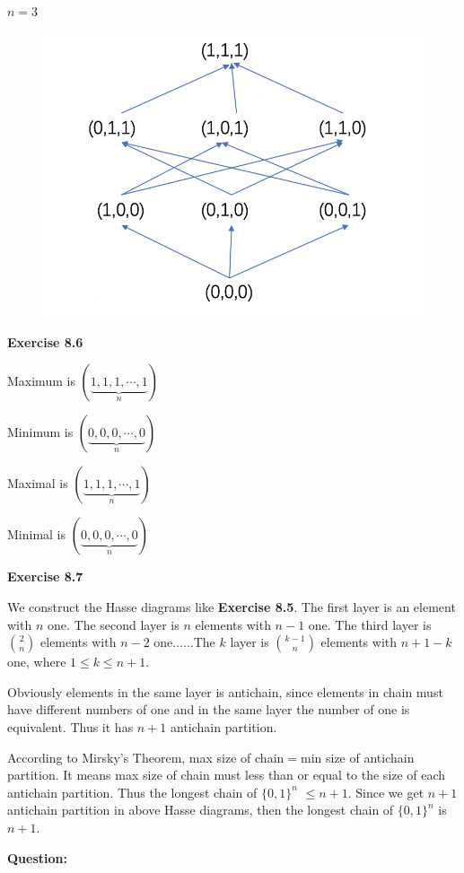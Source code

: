 \documentclass{article} %
\begin{document}
	$n=3$\par
	\begin{figure}[H]
  	\centering
  	\includegraphics[scale=0.5]{8_5_2.png}
  	\caption{}
  	\label{}
  	\end{figure}
	\textbf{Exercise 8.6}\par
	Maximum is $(\underbrace{1,1,1,\cdots,1}_{n})$\par
	Minimum is $(\underbrace{0,0,0,\cdots,0}_{n})$\par
	Maximal is  $(\underbrace{1,1,1,\cdots,1}_{n})$\par
	Minimal is $(\underbrace{0,0,0,\cdots,0}_{n})$\par
	\textbf{Exercise 8.7}\par
	We construct the Hasse diagrams like \textbf{Exercise 8.5}. 
	The first layer is an element with $n$ one. The second layer is $n$ elements with $n-1$ one.
	The third layer is $\binom{2}{n}$ elements with $n-2$ one......The $k$ layer is $\binom{k-1}{n}$ elements with $n+1-k$ one, where $1\leq k\leq n+1$.\par
	Obviously elements in the same layer is antichain, since elements in chain must have different numbers of one and in the same layer the number of one is equivalent.
	Thus it has $n+1$ antichain partition.\par
	According to Mirsky's Theorem, max size of chain$=$min size of antichain partition. It means max size of chain must less than or equal to the size of each antichain partition. 
	Thus the longest chain of ${\{0,1\}}^n$ $\leq n+1$. Since we get $n+1$ antichain partition in above Hasse diagrams, then the longest chain of ${\{0,1\}}^n$ is $n+1$.\par 
	

	


	\textbf{Question:}\par
	
\end{document}
